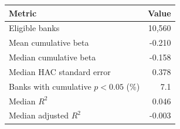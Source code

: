 \begin{tabular}{lr}
\toprule
Metric & Value \\
\midrule
Eligible banks & 10,560 \\
Mean cumulative beta & -0.210 \\
Median cumulative beta & -0.158 \\
Median HAC standard error & 0.378 \\
Banks with cumulative $p<0.05$ (\%) & 7.1 \\
Median $R^2$ & 0.046 \\
Median adjusted $R^2$ & -0.003 \\
\bottomrule
\end{tabular}
